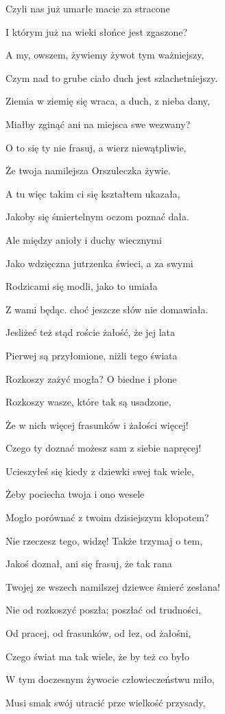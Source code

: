 \documentclass{article}
\begin{document}
Czyli nas już umarłe macie za stracone

I którym już na wieki słońce jest zgaszone?

A my, owszem, żywiemy żywot tym ważniejszy,

Czym nad to grube ciało duch jest szlachetniejszy.

Ziemia w ziemię się wraca, a duch, z nieba dany,

Miałby zginąć ani na miejsca swe wezwany?

O to się ty nie frasuj, a wierz niewątpliwie,

Że twoja namilejsza Orszuleczka żywie.

A tu więc takim ci się kształtem ukazała,

Jakoby się śmiertelnym oczom poznać dała.

Ale między anioły i duchy wiecznymi

Jako wdzięczna jutrzenka świeci, a za swymi

Rodzicami się modli, jako to umiała

Z wami będąc. choć jeszcze słów nie domawiała.

Jesliżeć też stąd roście żałość, że jej lata

Pierwej są przyłomione, niżli tego świata

Rozkoszy zażyć mogła? O biedne i płone

Rozkoszy wasze, które tak są usadzone,

Że w nich więcej frasunków i żałości więcej!

Czego ty doznać możesz sam z siebie napręcej!

Ucieszyłeś się kiedy z dziewki swej tak wiele,

Żeby pociecha twoja i ono wesele

Mogło porównać z twoim dzisiejszym kłopotem?

Nie rzeczesz tego, widzę! Także trzymaj o tem,

Jakoś doznał, ani się frasuj, że tak rana

Twojej ze wszech namilszej dziewce śmierć zesłana!

Nie od rozkoszyć poszła; poszłać od trudności,

Od pracej, od frasunków, od łez, od żałośni,

Czego świat ma tak wiele, że by też co było

W tym doczesnym żywocie człowieczeństwu miło,

Musi smak swój utracić prze wielkość przysady,
\end{document}

